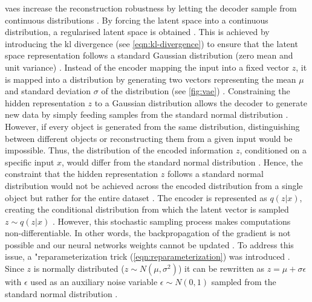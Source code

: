 \glspl{vae} increase the reconstruction robustness by letting the decoder sample from continuous distributions \cite{kingma2013AutoEncodingVariationalBayes}.
By forcing the latent space into a continuous distribution, a regularised latent space is obtained \cite{rocca2019UnderstandingVariationalAutoencoders}.
This is achieved by introducing the \gls{kl} divergence (see \autoref{eqn:kl-divergence}) to ensure that the latent space representation follows a standard Gaussian distribution (zero mean and unit variance) \cite{razghandi2022VariationalAutoencoderGenerativea, aggarwal2018NeuralNetworksDeep}.
Instead of the encoder mapping the input into a fixed vector $z$, it is mapped into a distribution by generating two vectors representing the mean $\mu$ and standard deviation $\sigma$ of the distribution (see \autoref{fig:vae}) \cite{razghandi2022VariationalAutoencoderGenerativea, aggarwal2018NeuralNetworksDeep}.
Constraining the hidden representation $z$ to a Gaussian distribution allows the decoder to generate new data by simply feeding samples from the standard normal distribution \cite{aggarwal2018NeuralNetworksDeep}.
However, if every object is generated from the same distribution, distinguishing between different objects or reconstructing them from a given input would be impossible.
Thus, the distribution of the encoded information $z$, conditioned on a specific input $x$, would differ from the standard normal distribution \cite{aggarwal2018NeuralNetworksDeep}. %
Hence, the constraint that the hidden representation $z$ follows a standard normal distribution would not be achieved across the encoded distribution from a single object but rather for the entire dataset \cite{aggarwal2018NeuralNetworksDeep}.
The encoder is represented as $q(z|x)$, creating the conditional distribution from which the latent vector is sampled $z\sim q(z|x)$ \cite{kingma2013AutoEncodingVariationalBayes}.
However, this stochastic sampling process makes computations non-differentiable.
In other words, the backpropagation of the gradient is not possible and our neural networks weights cannot be updated \cite{aggarwal2018NeuralNetworksDeep}.
To address this issue, a "reparameterization trick (\autoref{eqn:reparameterization}) was introduced \cite[p. 4]{kingma2013AutoEncodingVariationalBayes}.
Since $z$ is normally distributed ($z\sim N(\mu,\sigma^2)$) it can be rewritten as $z=\mu+\sigma\epsilon$ with $\epsilon$ used as an auxiliary noise variable $\epsilon \sim N(0,1)$ sampled from the standard normal distribution \cite{kingma2013AutoEncodingVariationalBayes}.

